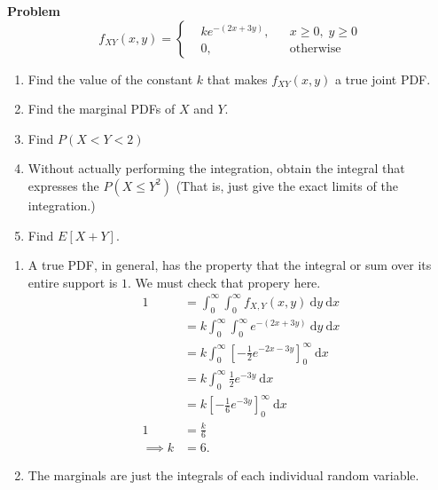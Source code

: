 \documentclass[12pt]{article}
\newenvironment{Ex}{\textbf{Problem}\vspace{.75em}\\}{}
\newcommand{\dd}[1]{\:\mathrm{d}{#1}}
\begin{document}
\begin{enumerate}
\begin{Ex}
    \begin{equation}
      \label{eq:6-question}
      f_{XY}(x,y) = \left\{
        \begin{aligned}
          & ke^{-(2x+3y)}, && x \ge 0,\; y \ge 0 \\
          & 0, && \text{otherwise}
        \end{aligned} \right.
    \end{equation}
    \begin{enumerate}
    \item Find the value of the constant $k$ that makes $f_{XY}(x,
      y)$ a true joint PDF.
    \item Find the marginal PDFs of $X$ and $Y$.
    \item Find $P(X<Y<2)$
    \item Without actually performing the integration, obtain the
      integral that expresses the $P(X \le Y^2)$ (That is, just give
      the exact limits of the integration.)
    \item Find $E[X +Y]$.
    \end{enumerate}
    \begin{solution} \hfill
      \begin{enumerate}
      \item A true PDF, in general, has the property that the
        integral or sum over its entire support is $1$. We must
        check that propery here.
        \begin{equation}
          \label{eq:6a-sol}
          \begin{aligned}
            1 &= \int_0^\infty \int_0^\infty f_{X,Y}(x,y) \dd{y}
            \dd{x} \\
            &= k \int_0^\infty \int_0^\infty e^{-(2x+3y)} \dd{y}
            \dd{x} \\
            &= k \int_0^\infty
            \left[-\frac{1}{2}e^{-2x-3y}\right]_0^\infty
            \dd{x} \\
            &= k \int_0^\infty \frac{1}{2}e^{-3y} \dd{x} \\
            &= k \left[-\frac{1}{6}e^{-3y}\right]_0^\infty \dd{x} \\
            1 &= \frac{k}{6} \\
            \implies k &= 6.
          \end{aligned}
        \end{equation}
      \item The marginals are just the integrals of each individual
        random variable.
        \begin{multicols}{2}

\end{multicols}
\end{enumerate}
\end{solution}
\end{Ex}
\end{enumerate}
\end{document}
